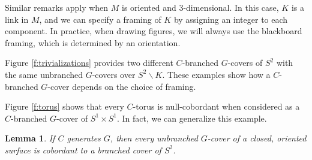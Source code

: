 \documentclass[10pt,twocolumn,amsmath,amssymb,aps,pra,secnumarabic,
    nofootinbib,groupedaddress]{revtex4-1}
\newtheorem{lemma}[theorem]{Lemma}
\renewcommand{\setminus}{\smallsetminus}
\begin{document}
Similar remarks apply when $M$ is oriented and 3-dimensional.  In this case, $K$ is a link in $M$, and we can specify a framing of $K$ by assigning an integer to each component.  In practice, when drawing figures, we will always use the blackboard framing, which is determined by an orientation.

Figure \ref{f:trivializations} provides two different $C$-branched $G$-covers of $S^2$ with the same unbranched $G$-covers over $S^2 \setminus K$.  These examples show how a $C$-branched $G$-cover depends on the choice of framing.

Figure \ref{f:torus} shows that every $C$-torus is null-cobordant when considered as a $C$-branched $G$-cover of $S^1 \times S^1$.  In fact, we can generalize this example.

\begin{lemma}
If $C$ generates $G$, then every unbranched $G$-cover of a closed, oriented surface is cobordant to a branched cover of $S^2$.
\label{l:unbranched}
\end{lemma}
\end{document}
